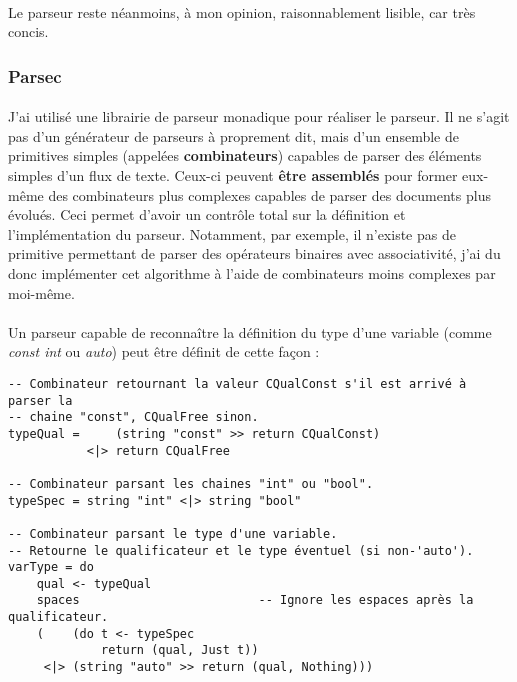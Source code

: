 \documentclass[a4paper]{article}
\begin{document}
    \paragraph{}Le parseur reste néanmoins, à mon opinion, raisonnablement 
lisible, car très concis.

   \subsubsection{Parsec}

    \paragraph{}J'ai utilisé une librairie de parseur monadique pour réaliser
le parseur. Il ne s'agit pas d'un générateur de parseurs à proprement dit, mais
d'un ensemble de primitives simples (appelées \textbf{combinateurs}) capables de
parser des éléments simples d'un flux de texte. Ceux-ci peuvent \textbf{être
assemblés} pour former eux-même des combinateurs plus complexes capables de
parser des documents plus évolués. Ceci permet d'avoir un contrôle total
sur la définition et l'implémentation du parseur. Notamment, par exemple, il
n'existe pas de primitive permettant de parser des opérateurs binaires avec
associativité, j'ai du donc implémenter cet algorithme à l'aide de combinateurs
moins complexes par moi-même.

    \paragraph{}Un parseur capable de reconnaître la définition
du type d'une variable (comme \textit{const int} ou \textit{auto}) peut être
définit de cette façon :

    \begin{verbatim}
-- Combinateur retournant la valeur CQualConst s'il est arrivé à parser la
-- chaine "const", CQualFree sinon.
typeQual =     (string "const" >> return CQualConst)
           <|> return CQualFree

-- Combinateur parsant les chaines "int" ou "bool".
typeSpec = string "int" <|> string "bool"

-- Combinateur parsant le type d'une variable.
-- Retourne le qualificateur et le type éventuel (si non-'auto').
varType = do
    qual <- typeQual
    spaces                         -- Ignore les espaces après la qualificateur.
    (    (do t <- typeSpec
             return (qual, Just t))
     <|> (string "auto" >> return (qual, Nothing)))
     \end{verbatim}
\end{document}
